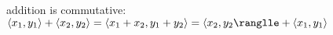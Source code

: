 \documentclass[preview]{standalone}
\begin{document}
\begin{center}
addition is commutative: $\langle x_1, y_1 \rangle + \langle x_2, y_2 \rangle = \langle x_1 + x_2, y_1 + y_2 \rangle = \langle x_2, y_2 \ranglle + \langle x_1, y_1 \rangle$
\end{center}
\end{document}

